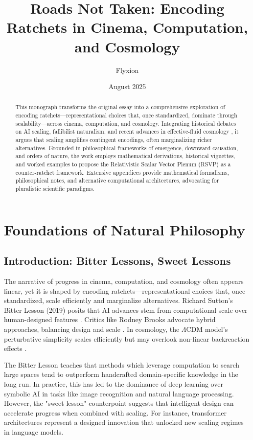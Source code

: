 \documentclass[12pt]{book}
\title{Roads Not Taken: Encoding Ratchets in Cinema, Computation, and Cosmology}
\author{Flyxion}
\date{August 2025}
\begin{document}
\frontmatter
\maketitle

\begin{abstract}
This monograph transforms the original essay into a comprehensive exploration of encoding ratchets—representational choices that, once standardized, dominate through scalability—across cinema, computation, and cosmology. Integrating historical debates on AI scaling, fallibilist naturalism, and recent advances in effective-fluid cosmology \citep{Giani2025}, it argues that scaling amplifies contingent encodings, often marginalizing richer alternatives. Grounded in philosophical frameworks of emergence, downward causation, and orders of nature, the work employs mathematical derivations, historical vignettes, and worked examples to propose the Relativistic Scalar Vector Plenum (RSVP) as a counter-ratchet framework. Extensive appendices provide mathematical formalisms, philosophical notes, and alternative computational architectures, advocating for pluralistic scientific paradigms.
\end{abstract}

\tableofcontents

\mainmatter
\part{Foundations of Natural Philosophy}

\chapter{Introduction: Bitter Lessons, Sweet Lessons}
The narrative of progress in cinema, computation, and cosmology often appears linear, yet it is shaped by encoding ratchets—representational choices that, once standardized, scale efficiently and marginalize alternatives. Richard Sutton’s Bitter Lesson (2019) posits that AI advances stem from computational scale over human-designed features \citep{Sutton2019}. Critics like Rodney Brooks advocate hybrid approaches, balancing design and scale \citep{Brooks2019}. In cosmology, the $\Lambda$CDM model’s perturbative simplicity scales efficiently but may overlook non-linear backreaction effects \citep{Buchert2000}.

The Bitter Lesson teaches that methods which leverage computation to search large spaces tend to outperform handcrafted domain-specific knowledge in the long run. In practice, this has led to the dominance of deep learning over symbolic AI in tasks like image recognition and natural language processing. However, the "sweet lesson" counterpoint suggests that intelligent design can accelerate progress when combined with scaling. For instance, transformer architectures represent a designed innovation that unlocked new scaling regimes in language models.
\end{document}
